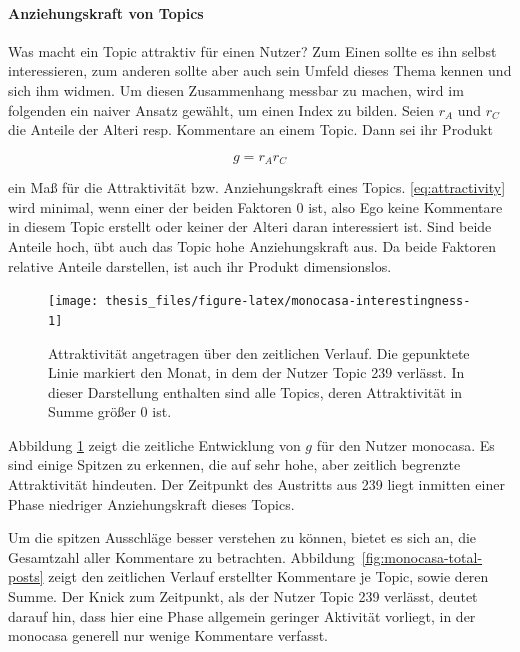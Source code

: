 \documentclass[11pt,a4paper,twoside]{article}
\let\oldpar\paragraph
\renewcommand{\paragraph}{\oldpar*}
\begin{document}
\hypertarget{anziehungskraft-von-topics}{%
\paragraph{Anziehungskraft von
Topics}\label{anziehungskraft-von-topics}}

Was macht ein Topic attraktiv für einen Nutzer? Zum Einen sollte es ihn
selbst interessieren, zum anderen sollte aber auch sein Umfeld dieses
Thema kennen und sich ihm widmen. Um diesen Zusammenhang messbar zu
machen, wird im folgenden ein naiver Ansatz gewählt, um einen Index zu
bilden. Seien \(r_{A}\) und \(r_{C}\) die Anteile der Alteri resp.
Kommentare an einem Topic. Dann sei ihr Produkt

\begin{equation}
g = r_A r_C
\label{eq:attractivity}
\end{equation}

ein Maß für die Attraktivität bzw. Anziehungskraft eines Topics.
\eqref{eq:attractivity} wird minimal, wenn einer der beiden Faktoren 0
ist, also Ego keine Kommentare in diesem Topic erstellt oder keiner der
Alteri daran interessiert ist. Sind beide Anteile hoch, übt auch das
Topic hohe Anziehungskraft aus. Da beide Faktoren relative Anteile
darstellen, ist auch ihr Produkt dimensionslos.






\begin{figure}

{\centering \texttt{[image: thesis\_files/figure-latex/monocasa-interestingness-1]} 

}

\caption{Attraktivität angetragen über den
zeitlichen Verlauf. Die gepunktete Linie markiert den Monat, in dem der
Nutzer Topic 239 verlässt. In dieser Darstellung enthalten sind alle
Topics, deren Attraktivität in Summe größer 0 ist.}\label{fig:monocasa-interestingness}
\end{figure}

Abbildung \ref{fig:monocasa-interestingness} zeigt die zeitliche
Entwicklung von \(g\) für den Nutzer monocasa. Es sind einige Spitzen zu
erkennen, die auf sehr hohe, aber zeitlich begrenzte Attraktivität
hindeuten. Der Zeitpunkt des Austritts aus 239 liegt inmitten einer
Phase niedriger Anziehungskraft dieses Topics.

Um die spitzen Ausschläge besser verstehen zu können, bietet es sich an,
die Gesamtzahl aller Kommentare zu betrachten.
Abbildung~\ref{fig:monocasa-total-posts} zeigt den zeitlichen Verlauf
erstellter Kommentare je Topic, sowie deren Summe. Der Knick zum
Zeitpunkt, als der Nutzer Topic 239 verlässt, deutet darauf hin, dass
hier eine Phase allgemein geringer Aktivität vorliegt, in der monocasa
generell nur wenige Kommentare verfasst.
\end{document}
